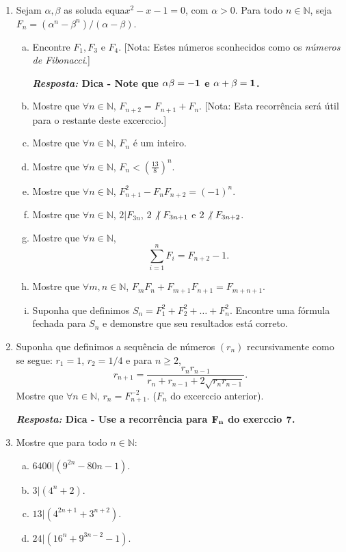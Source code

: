 \begin{enumerate}[{\bf 1.}]
\item Sejam $\alpha,\beta$ as solu\coes da equa\cao $x^2-x-1=0$, com $\alpha >0$. Para todo $n\in\mathbb{N}$, seja $F_n=(\alpha^n-\beta^n)/(\alpha-\beta)$.
\begin{enumerate}[a)]
\item Encontre $F_1,F_3$ e $F_4$. [Nota: Estes n\'umeros s\ao conhecidos como os {\it n\'umeros de Fibonacci}.] 

{\bf{\it Resposta:} Dica - Note que ${\bf \alpha\beta=-1}$ e ${\bf \alpha+\beta=1}$.}

\item Mostre que $\forall n\in\mathbb{N}$, $F_{n+2}=F_{n+1}+F_n$. [Nota: Esta recorr\^encia ser\'a \'util para o restante deste excerc\ih cio.]  
\item Mostre que $\forall n\in\mathbb{N}$, $F_n$ \'e um inteiro.
\item Mostre que $\forall n\in\mathbb{N}$, $F_n<(\frac{13}{8})^n$.
\item Mostre que $\forall n\in\mathbb{N}$, $F^2_{n+1}-F_nF_{n+2}=(-1)^n$.
\item Mostre que $\forall n\in\mathbb{N}$, $2|F_{3n}$, $2\not|\textrm{ } F_{3n+1}$ e $2\not|\textrm{ } F_{3n+2}$.
\item Mostre que $\forall n\in\mathbb{N}$, 
\[
\sum_{i=1}^{n}F_i=F_{n+2}-1.
\]
\item Mostre que $\forall m,n\in\mathbb{N}$, $F_mF_n+F_{m+1}F_{n+1}=F_{m+n+1}$. 
\item Suponha que definimos $S_n=F_{1}^{2}+F_{2}^{2}+\ldots+F_{n}^{2}$. Encontre uma f\'ormula fechada para $S_n$ e demonstre que seu resultados est\'a correto.
\end{enumerate}

\item Suponha que definimos a sequ\^encia de n\'umeros $(r_n)$ recursivamente como se segue: $r_1=1$, $r_2=1/4$ e para $n\geq 2$,
\[
r_{n+1}=\frac{r_nr_{n-1}}{r_n+r_{n-1}+2\sqrt{r_nr_{n-1}}}.
\]
Mostre que $\forall n\in\mathbb{N}$, $r_n=F^{-2}_{n+1}$. ($F_n$ do excerc\ih cio anterior).

{\bf{\it Resposta:} Dica - Use a recorr\^encia para ${\bf F_n}$ do exerc\ih cio ${\bf 7}$.}

\item Mostre que para todo $n\in\mathbb{N}:$
\begin{enumerate}[a)]
\item $6400|(9^{2n}-80n-1)$.
\item $3|(4^n+2)$.
\item $13|(4^{2n+1}+3^{n+2})$.
\item $24|(16^n+9^{3n-2}-1)$.
\end{enumerate}


\end{enumerate}
